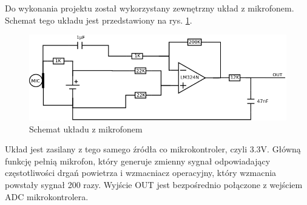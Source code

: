 Do wykonania projektu został wykorzystany zewnętrzny układ z mikrofonem. Schemat tego układu jest przedstawiony na rys. \ref{uklad}.
\begin{figure}
    \label{uklad}
    \includegraphics[width=1.0\textwidth]{schemat_mic.png}
    \caption{Schemat układu z mikrofonem}
\end{figure}
Układ jest zasilany z tego samego źródła co mikrokontroler, czyli 3.3V. Główną funkcję pełnią mikrofon, który generuje zmienny sygnał odpowiadający częstotliwości drgań powietrza i wzmacniacz operacyjny, który wzmacnia powstały sygnał 200 razy. Wyjście OUT jest bezpośrednio połączone z wejściem ADC mikrokontrolera.

